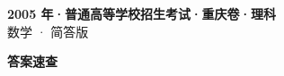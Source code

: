 \documentclass[zihao=-4, a4paper]{ctexart}
\begin{document}
\begin{center}
  {\Large\bfseries 2005 年·普通高等学校招生考试·重庆卷·理科}\\[4pt]
  {\large 数学 · 简答版}
\end{center}
\medskip
{}

\clearpage
{}
\begin{center}{\Large\bfseries 答案速查}\end{center}
\medskip

\end{document}
